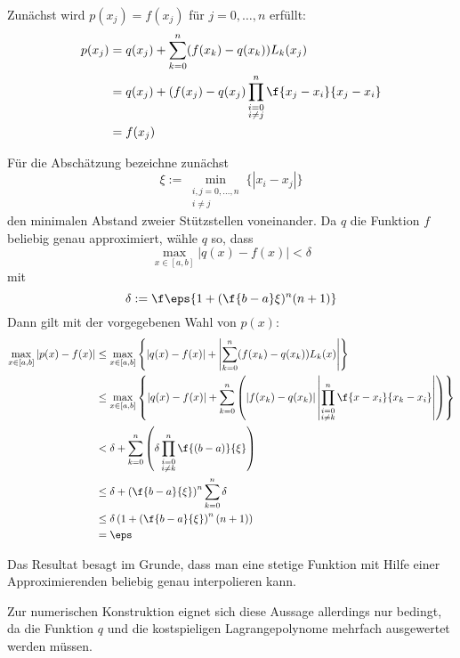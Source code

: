\documentclass[a4paper]{scrartcl}
\begin{document}
\begin{aufgabe}~

	Zunächst wird $p(x_j) =f(x_j)$ für $j=0,\dotsc,n$ erfüllt:
	\begin{align*}
		p(x_j)
		&= q(x_j) + \sum_{k=0}^n (f(x_k)-q(x_k)) L_k(x_j)\\
		&= q(x_j) + (f(x_j) -q(x_j) \prod_{\substack{i=0\\i\neq j}}^n \f{x_j-x_i}{x_j-x_i}\\
		&= f(x_j)
	\end{align*}

	Für die Abschätzung bezeichne zunächst 
	\[
		\xi := \min_{\substack{i,j=0,\dotsc,n\\i\neq j}} \{|x_i - x_j|\}
	\]
	den minimalen Abstand zweier Stützstellen voneinander.
	Da $q$ die Funktion $f$ beliebig genau approximiert, wähle $q$ so, dass
	\[
		\max_{x\in [a,b]}|q(x)-f(x)| < \delta
	\]
	mit 
	\[
		\delta := \f \eps{1+ (\f {b-a}\xi)^n(n+1)}
	\]
	Dann gilt mit der vorgegebenen Wahl von $p(x)$:
	\begin{align*}
		\max_{x\in [a,b]} |p(x)-f(x)| 
		&\le \max_{x\in [a,b]}\left\{ |q(x)-f(x)| + \left| \sum_{k=0}^n (f(x_k) - q(x_k)) L_k(x) \right| \right\} \\
		&\le \max_{x\in [a,b]}\left\{ |q(x)-f(x)| + \sum_{k=0}^n \left(|f(x_k) - q(x_k)| \left|\prod_{\substack{i=0\\i\neq k}}^n \f {x-x_i}{x_k-x_i} \right|\right) \right\} \\
		&< \delta + \sum_{k=0}^n \left(\delta \prod_{\substack{i=0\\i\neq k}}^n \f {(b-a)}{\xi} \right) \\
		&\le \delta + \left(\f{b-a}{\xi}\right)^n \sum_{k=0}^n \delta  \\
		&\le \delta \left( 1 + \left(\f{b-a}{\xi}\right)^n (n+1)\right)  \\
		&= \eps
	\end{align*}

	Das Resultat besagt im Grunde, dass man eine stetige Funktion mit Hilfe einer Approximierenden beliebig genau interpolieren kann.
	
	Zur numerischen Konstruktion eignet sich diese Aussage allerdings nur bedingt, da die Funktion $q$ und die kostspieligen Lagrangepolynome mehrfach ausgewertet werden müssen.
\end{aufgabe}
	
\end{document}
